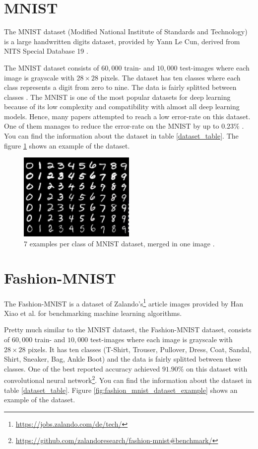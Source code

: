 \section{MNIST}
The MNIST dataset (Modified National Institute of Standards and Technology) is a large handwritten
digits dataset, provided by Yann Le Cun, derived from NITS Special Database 19 \cite{NIST}.

The MNIST dataset consists of $60,000$ train- and $10,000$ test-images where each image is grayscale
with $28 \times 28$ pixels. The dataset has ten classes where each class represents a digit from
zero to nine. The data is fairly
splitted between classes \cite{MNIST_data_reference}. The MNIST is one of the most popular datasets for
deep learning because of its low complexity and compatibility with almost all deep learning
models. Hence, many papers attempted to reach a low error-rate on this dataset. One of them manages
to reduce the error-rate on the MNIST by up to $0.23\%$ \cite{MNIST_best_result_reference}. You can
find the information about the dataset in table
\ref{dataset_table}. The figure \ref{fig:mnist_dataset_example} shows an example of the dataset.

\begin{figure}
  \centering
  \label{fig:mnist_dataset_example}
  \includegraphics[width=0.5\textwidth]{fig/mnist}
  \caption{7 examples per class of MNIST dataset, merged in one image \cite{MNIST_dataset_example}.}
\end{figure}


\section{Fashion-MNIST}
The Fashion-MNIST is a dataset of Zalando's\footnote{\url{https://jobs.zalando.com/de/tech/}}
article images provided by Han Xiao et al. \cite{Fashion_MNIST_reference} for benchmarking machine learning algorithms.

Pretty much similar to the MNIST dataset, the Fashion-MNIST dataset, consists of $60,000$ train- and
$10,000$ test-images where each image is grayscale
with $28 \times 28$ pixels. It has ten classes (T-Shirt, Trouser, Pullover, Dress, Coat,
Sandal, Shirt, Sneaker, Bag, Ankle Boot) and the data is fairly
splitted between these classes. One of the best reported accuracy achieved $91.90\%$ on this dataset with convolutional neural
network\footnote{\url{https://github.com/zalandoresearch/fashion-mnist\#benchmark/}}. You can
find the information about the dataset in table
\ref{dataset_table}. Figure \ref{fig:fashion_mnist_dataset_example} shows an example of the dataset.


